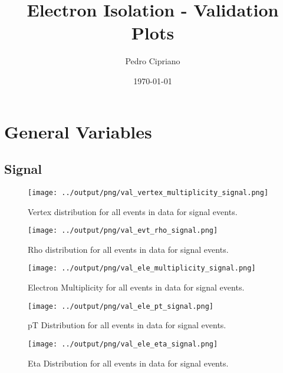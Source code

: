 \documentclass[11pt]{book}
\begin{document}
         
 
 \author{Pedro Cipriano}
 \date{\today}
 \title{Electron Isolation - Validation Plots}

\maketitle

\tableofcontents

\chapter{General Variables}
\section{Signal}

\begin{figure}[htb]
\centering
\texttt{[image: ../output/png/val\_vertex\_multiplicity\_signal.png]}
\caption{Vertex distribution for all events in data for signal events.}
\label{fig:val_vertex_multiplicity_signal}
\end{figure}

\begin{figure}[htb]
\centering
\texttt{[image: ../output/png/val\_evt\_rho\_signal.png]}
\caption{Rho distribution for all events in data for signal events.}
\label{fig:val_evt_rho_signal}
\end{figure}

\begin{figure}[htb]
\centering
\texttt{[image: ../output/png/val\_ele\_multiplicity\_signal.png]}
\caption{Electron Multiplicity for all events in data for signal events.}
\label{fig:val_ele_multiplicity_signal}
\end{figure}

\begin{figure}[htb]
\centering
\texttt{[image: ../output/png/val\_ele\_pt\_signal.png]}
\caption{pT Distribution for all events in data for signal events.}
\label{fig:val_ele_pt_signal}
\end{figure}

\begin{figure}[htb]
\centering
\texttt{[image: ../output/png/val\_ele\_eta\_signal.png]}
\caption{Eta Distribution for all events in data for signal events.}
\label{fig:val_ele_eta_signal}
\end{figure}
\end{document}
